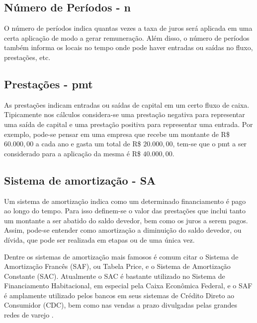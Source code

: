 \subsection{Número de Períodos - n}

O número de períodos indica quantas vezes a taxa de juros será aplicada em uma certa aplicação de modo a gerar remuneração. Além disso, o número de períodos também informa os locais no tempo onde pode haver entradas ou saídas no fluxo, prestações, etc.

\subsection{Prestações - pmt}

As prestações indicam entradas ou saídas de capital em um certo fluxo de caixa. Tipicamente nos cálculos considera-se uma prestação negativa para representar uma saída de capital e uma prestação positiva para representar uma entrada. Por exemplo, pode-se pensar em uma empresa que recebe um montante de R\$ $60.000,00$ a cada ano e gasta um total de R\$ $20.000,00$, tem-se que o pmt a ser considerado para a aplicação da mesma é R\$ $40.000,00$.


\subsection{Sistema de amortização - SA}

Um sistema de amortização indica como um determinado financiamento é pago ao longo do tempo. Para isso definem-se o valor das prestações que inclui tanto um montante a ser abatido do saldo devedor, bem como os juros a serem pagos. Assim, pode-se entender como amortização a diminuição do saldo devedor, ou dívida, que pode ser realizada em etapas ou de uma única vez.

Dentre os sistemas de amortização mais famosos é comum citar o Sistema de Amortização Francês (SAF), ou Tabela Price, e o Sistema de Amortização Constante (SAC). Atualmente o SAC é bastante utilizado no Sistema de Financiamento Habitacional, em especial pela Caixa Econômica Federal, e o SAF é amplamente utilizado pelos bancos em seus sistemas de Crédito Direto ao Consumidor (CDC), bem como nas vendas a prazo divulgadas pelas grandes redes de varejo \cite{usoSACSAF}.

